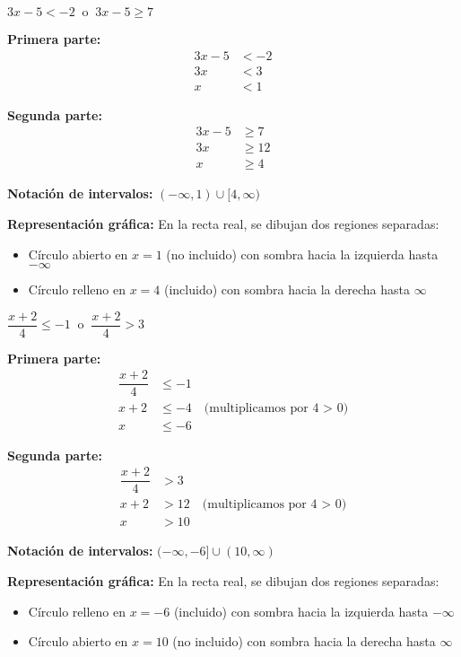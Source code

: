 \begin{exercise}
\problem $3x - 5 < -2 \;\;\text{o}\;\; 3x - 5 \ge 7$

\begin{solucion}
\textbf{Primera parte:}
\begin{align*}
3x - 5 &< -2 \\
3x &< 3 \\
x &< 1
\end{align*}

\textbf{Segunda parte:}
\begin{align*}
3x - 5 &\ge 7 \\
3x &\ge 12 \\
x &\ge 4
\end{align*}

\textbf{Notación de intervalos:} $(-\infty, 1) \cup [4, \infty)$

\textbf{Representación gráfica:} En la recta real, se dibujan dos regiones separadas:
\begin{itemize}
    \item Círculo abierto en $x = 1$ (no incluido) con sombra hacia la izquierda hasta $-\infty$
    \item Círculo relleno en $x = 4$ (incluido) con sombra hacia la derecha hasta $\infty$
\end{itemize}
\end{solucion}

\problem $\dfrac{x + 2}{4} \le -1 \;\;\text{o}\;\; \dfrac{x + 2}{4} > 3$

\begin{solucion}
\textbf{Primera parte:}
\begin{align*}
\dfrac{x + 2}{4} &\le -1 \\
x + 2 &\le -4 \quad \text{(multiplicamos por 4 > 0)} \\
x &\le -6
\end{align*}

\textbf{Segunda parte:}
\begin{align*}
\dfrac{x + 2}{4} &> 3 \\
x + 2 &> 12 \quad \text{(multiplicamos por 4 > 0)} \\
x &> 10
\end{align*}

\textbf{Notación de intervalos:} $(-\infty, -6] \cup (10, \infty)$

\textbf{Representación gráfica:} En la recta real, se dibujan dos regiones separadas:
\begin{itemize}
    \item Círculo relleno en $x = -6$ (incluido) con sombra hacia la izquierda hasta $-\infty$
    \item Círculo abierto en $x = 10$ (no incluido) con sombra hacia la derecha hasta $\infty$
\end{itemize}
\end{solucion}
\end{exercise}

